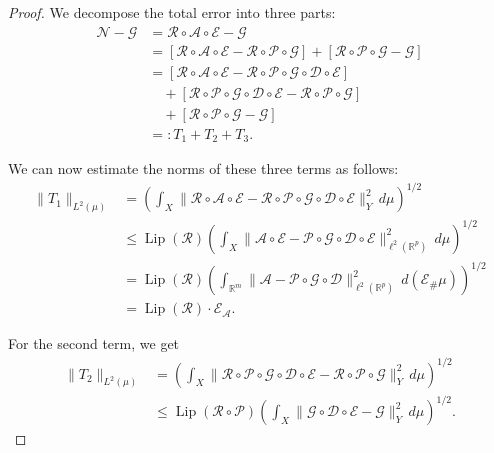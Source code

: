 \documentclass{article}
\numberwithin{equation}{section}
\theoremstyle{plain}
\newcommand{\RR}{\mathbb{R}}
\newcommand{\Lip}{\operatorname{Lip}}
\begin{document}
	\begin{proof}
		We decompose the total error into three parts:
		\begin{equation*}
			\begin{aligned}
				\mathscr{N} - \mathscr{G}
				&= \mathcal{R}\circ\mathcal{A}\circ\mathcal{E} - \mathscr{G} \\
				&= [\mathcal{R}\circ\mathcal{A}\circ\mathcal{E} - \mathcal{R}\circ\mathcal{P}\circ \mathscr{G}]
				+[\mathcal{R}\circ\mathcal{P}\circ \mathscr{G}-\mathscr{G}] \\
				&= [\mathcal{R}\circ\mathcal{A}\circ\mathcal{E} - \mathcal{R}\circ\mathcal{P}\circ \mathscr{G}\circ\mathcal{D}\circ\mathcal{E}] \\
				&\quad + [\mathcal{R}\circ\mathcal{P}\circ \mathscr{G}\circ\mathcal{D}\circ\mathcal{E} - \mathcal{R}\circ\mathcal{P}\circ \mathscr{G}] \\
				&\quad + [\mathcal{R}\circ\mathcal{P}\circ \mathscr{G} - \mathscr{G}] \\
				&=: T_1+T_2+T_3.
			\end{aligned}
		\end{equation*}
		
		We can now estimate the norms of these three terms as follows:
		\begin{equation*}
			\begin{aligned}
				\|T_1\|_{L^2(\mu)}
				&=
				\left(
				\int_X
				\|\mathcal{R}\circ\mathcal{A}\circ\mathcal{E}
				-
				\mathcal{R}\circ\mathcal{P}\circ \mathscr{G}\circ\mathcal{D}\circ\mathcal{E}\|_{Y}^{2}
				\,d\mu
				\right)^{1/2}\\
				&\leq
				\Lip(\mathcal{R})
				\left(
				\int_X
				\|\mathcal{A}\circ\mathcal{E}
				-
				\mathcal{P}\circ \mathscr{G}\circ\mathcal{D}\circ\mathcal{E}\|_{\ell^2(\RR^p)}^{2}
				\,d\mu
				\right)^{1/2}\\
				&=
				\Lip(\mathcal{R})
				\left(
				\int_{\RR^m}
				\|
				\mathcal{A}
				-
				\mathcal{P}\circ \mathscr{G}\circ\mathcal{D}
				\|_{\ell^2(\RR^p)}^{2}
				\,d(\mathcal{E}_{\#}\mu)
				\right)^{1/2}\\
				&=
				\Lip(\mathcal{R})\cdot \mathscr{E}_{\mathcal{A}}.
			\end{aligned}
		\end{equation*}
		
		For the second term, we get
		\begin{equation*}
			\begin{aligned}
				\|T_2\|_{L^2(\mu)}
				&=
				\left(
				\int_X
				\|
				\mathcal{R}\circ\mathcal{P}\circ \mathscr{G}\circ\mathcal{D}\circ\mathcal{E}
				-
				\mathcal{R}\circ\mathcal{P}\circ \mathscr{G}
				\|_{Y}^{2}
				\,d\mu
				\right)^{1/2}\\
				&\leq
				\Lip(\mathcal{R}\circ\mathcal{P})
				\left(
				\int_X
				\|
				\mathscr{G}\circ\mathcal{D}\circ\mathcal{E}
				-
				\mathscr{G}
				\|_{Y}^{2}
				\,d\mu
				\right)^{1/2}.
			\end{aligned}
		\end{equation*}
		

\end{proof}
\end{document}
